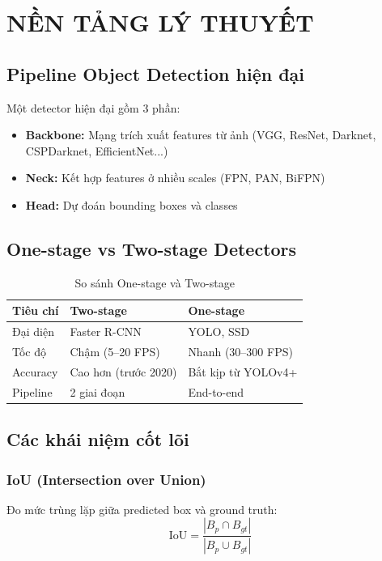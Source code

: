 \chapter{NỀN TẢNG LÝ THUYẾT}

\section{Pipeline Object Detection hiện đại}

Một detector hiện đại gồm 3 phần:
\begin{itemize}
    \item \textbf{Backbone:} Mạng trích xuất features từ ảnh (VGG, ResNet, Darknet, CSPDarknet, EfficientNet...)
    \item \textbf{Neck:} Kết hợp features ở nhiều scales (FPN, PAN, BiFPN)
    \item \textbf{Head:} Dự đoán bounding boxes và classes
\end{itemize}

\section{One-stage vs Two-stage Detectors}

\begin{table}[H]
\centering
\caption{So sánh One-stage và Two-stage}
\begin{tabular}{lll}
\toprule
\textbf{Tiêu chí} & \textbf{Two-stage} & \textbf{One-stage} \\
\midrule
Đại diện & Faster R-CNN & YOLO, SSD \\
Tốc độ & Chậm (5--20 FPS) & Nhanh (30--300 FPS) \\
Accuracy & Cao hơn (trước 2020) & Bắt kịp từ YOLOv4+ \\
Pipeline & 2 giai đoạn & End-to-end \\
\bottomrule
\end{tabular}
\end{table}

\section{Các khái niệm cốt lõi}

\subsection{IoU (Intersection over Union)}
Đo mức trùng lặp giữa predicted box và ground truth:
\[
\text{IoU} = \frac{|B_p \cap B_{gt}|}{|B_p \cup B_{gt}|}
\]

